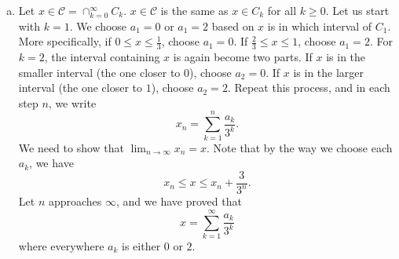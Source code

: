 \documentclass[letterpaper, 12pt]{article}
\begin{document}
\begin{solution}
\begin{enumerate}[(a)]
  \item Let \(x\in \mathcal{C}=\cap_{k=0}^\infty C_k\). \(x\in \mathcal{C}\) is the same as \(x\in C_k\) for all \(k\geq 0\). Let us     start with \(k=1\). We choose \(a_1=0\) or \(a_1=2\) based on \(x\) is in which interval of \(C_1\). More specifically, if \(0\leq x\leq \frac{1}{3}\), choose \(a_1=0\). If \(\frac{2}{3}\leq x\leq 1\), choose \(a_1=2\). For \(k=2\), the interval containing \(x\) is again become two parts. If \(x\) is in the smaller interval (the one closer to \(0\)), choose \(a_2=0\). If \(x\) is in the larger interval (the one closer to \(1\)), choose \(a_2=2\). Repeat this process, and in each step \(n\), we write 
  \[x_n=\sum_{k=1}^{n}\frac{a_k}{3^k}.\]
  We need to show that \(\lim_{n\to \infty} x_n=x\). Note that by the way we choose each \(a_k\), we have 
  \[x_n\leq x\leq x_n+\frac{3}{3^n}.\]
  Let \(n\) approaches \(\infty\), and we have proved that 
  \[x=\sum_{k=1}^{\infty}\frac{a_k}{3^k}\]
  where everywhere \(a_k\) is either \(0\) or \(2\).


\end{enumerate}
\end{solution}
\end{document}
